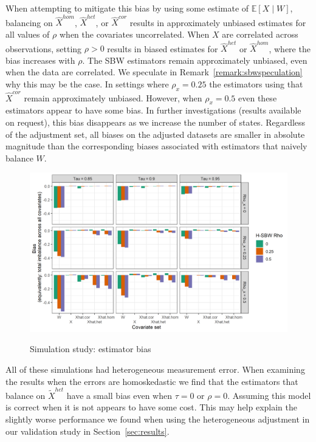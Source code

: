 When attempting to mitigate this bias by using some estimate of $\mathbb{E}[X \mid W]$, balancing on $\hat{X}^{hom}$, $\hat{X}^{het}$, or $\hat{X}^{cor}$ results in approximately unbiased estimates for all values of $\rho$ when the covariates uncorrelated. When $X$ are correlated across observations, setting $\rho > 0$ results in biased estimates for $\hat{X}^{het}$ or $\hat{X}^{hom}$, where the bias increases with $\rho$. The SBW estimators remain approximately unbiased, even when the data are correlated. We speculate in Remark~\ref{remark:sbwspeculation} why this may be the case. In settings where $\rho_x = 0.25$ the estimators using that $\hat{X}^{cor}$ remain approximately unbiased. However, when $\rho_x = 0.5$ even these estimators appear to have some bias. In further investigations (results available on request), this bias disappears as we increase the number of states. Regardless of the adjustment set, all biases on the adjusted datasets are smaller in absolute magnitude than the corresponding biases associated with estimators that naively balance $W$. 

\begin{figure}[H]
\begin{center}
    \caption{Simulation study: estimator bias}\label{fig:simbias}
    \label{fig:loveplotc1}
    \includegraphics[scale=0.5]{01_Plots/bias-plot.png}
\end{center}
\end{figure}

All of these simulations had heterogeneous measurement error. When examining the results when the errors are homoskedastic we find that the estimators that balance on $\tilde{X}^{het}$ have a small bias even when $\tau = 0$ or $\rho = 0$. Assuming this model is correct when it is not appears to have some cost. This may help explain the slightly worse performance we found when using the heterogeneous adjustment in our validation study in Section~\ref{sec:results}.

